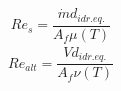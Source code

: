 \documentclass[a4paper,10pt]{article}                                                                                       %
\begin{document}
\vspace{3mm}                                                                                                                %
\begin{equation}                                                                                                            %
  \label{eqn:re_shell}                                                                                                      %
  Re_s = \frac{\dot{m}d_{idr.eq.}}{A_f\mu(T)}                                                                               %
\end{equation}                                                                                                              %
\vspace{3mm}                                                                                                                %
\begin{equation}                                                                                                            %
  \label{eqn:re_alt}                                                                                                        %
  Re_{alt} = \frac{\dot{V}d_{idr.eq.}}{A_f\nu(T)}                                                                           %
\end{equation}                                                                                                              %
\vspace{3mm}                                                                                                                %
\end{document}
